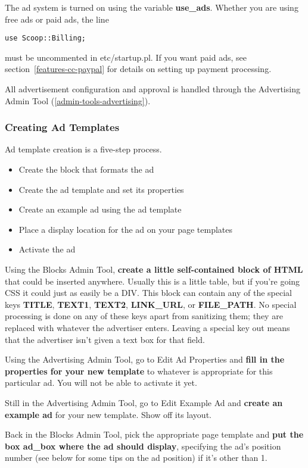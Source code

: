 The ad system is turned on using the variable {\bf use\_ads}. Whether you are using free ads or paid ads, the line
\begin{verbatim}
use Scoop::Billing;
\end{verbatim}
must be uncommented in etc/startup.pl. If you want paid ads, see section~\ref{features-cc-paypal} for details on setting up payment processing.

All advertisement configuration and approval is handled through the Advertising Admin Tool (\ref{admin-tools-advertising}).

\subsubsection{Creating Ad Templates}

Ad template creation is a five-step process.
\begin{itemize}
\item Create the block that formats the ad
\item Create the ad template and set its properties
\item Create an example ad using the ad template
\item Place a display location for the ad on your page templates
\item Activate the ad
\end{itemize}

Using the Blocks Admin Tool, {\bf create a little self-contained block of HTML} that could be inserted anywhere.  Usually this is a little table, but if you're going CSS it could just as easily be a DIV.  This block can contain any of the special keys {\bf TITLE}, {\bf TEXT1}, {\bf TEXT2}, {\bf LINK\_URL}, or {\bf FILE\_PATH}.  No special processing is done on any of these keys apart from sanitizing them; they are replaced with whatever the advertiser enters.  Leaving a special key out means that the advertiser isn't given a text box for that field.

Using the Advertising Admin Tool, go to Edit Ad Properties and {\bf fill in the properties for your new template} to whatever is appropriate for this particular ad.  You will not be able to activate it yet.

Still in the Advertising Admin Tool, go to Edit Example Ad and {\bf create an example ad} for your new template.  Show off its layout.

Back in the Blocks Admin Tool, pick the appropriate page template and {\bf put the box ad\_box where the ad should display}, specifying the ad's position number (see below for some tips on the ad position) if it's other than 1.

